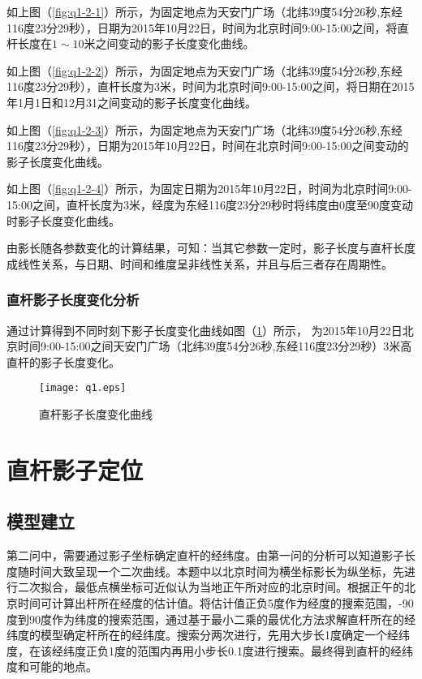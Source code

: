 \documentclass[withoutpreface,bwprint]{cumcmthesis} %
\begin{document}
\par 如上图（\ref{fig:q1-2-1}）所示，为固定地点为天安门广场（北纬39度54分26秒,东经116度23分29秒），日期为2015年10月22日，时间为北京时间9:00-15:00之间，将直杆长度在$1\sim10$米之间变动的影子长度变化曲线。

\par 如上图（\ref{fig:q1-2-2}）所示，为固定地点为天安门广场（北纬39度54分26秒,东经116度23分29秒），直杆长度为3米，时间为北京时间9:00-15:00之间，将日期在2015年1月1日和12月31之间变动的影子长度变化曲线。
\par 如上图（\ref{fig:q1-2-3}）所示，为固定地点为天安门广场（北纬39度54分26秒,东经116度23分29秒），日期为2015年10月22日，时间在北京时间9:00-15:00之间变动的影子长度变化曲线。
\par 如上图（\ref{fig:q1-2-4}）所示，为固定日期为2015年10月22日，时间为北京时间9:00-15:00之间，直杆长度为3米，经度为东经116度23分29秒时将纬度由0度至90度变动时影子长度变化曲线。

\par 由影长随各参数变化的计算结果，可知：当其它参数一定时，影子长度与直杆长度成线性关系，与日期、时间和维度呈非线性关系，并且与后三者存在周期性。

\subsubsection{直杆影子长度变化分析}

通过计算得到不同时刻下影子长度变化曲线如图（\ref{fig:q1-ans}）所示，
为2015年10月22日北京时间9:00-15:00之间天安门广场（北纬39度54分26秒,东经116度23分29秒）3米高直杆的影子长度变化。
\begin{figure}[h]
\small
\centering
\texttt{[image: q1.eps]}
\caption{直杆影子长度变化曲线} \label{fig:q1-ans}
\end{figure}



\newpage
\section{直杆影子定位}
\subsection{模型建立}
第二问中，需要通过影子坐标确定直杆的经纬度。由第一问的分析可以知道影子长度随时间大致呈现一个二次曲线。本题中以北京时间为横坐标影长为纵坐标，先进行二次拟合，最低点横坐标可近似认为当地正午所对应的北京时间。根据正午的北京时间可计算出杆所在经度的估计值。将估计值正负5度作为经度的搜索范围，-90度到90度作为纬度的搜索范围，通过基于最小二乘的最优化方法求解直杆所在的经纬度的模型确定杆所在的经纬度。搜索分两次进行，先用大步长1度确定一个经纬度，在该经纬度正负1度的范围内再用小步长0.1度进行搜索。最终得到直杆的经纬度和可能的地点。
\end{document}
